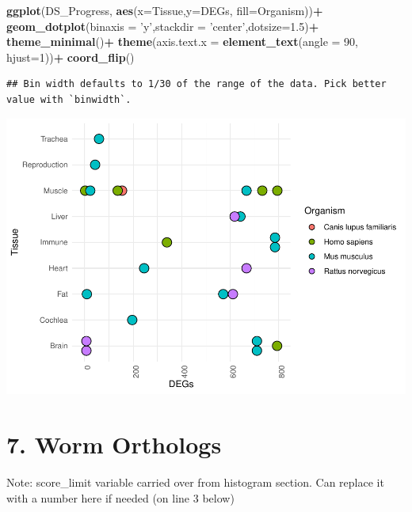 \documentclass[
]{article}
\newenvironment{Shaded}{\begin{snugshade}}{\end{snugshade}}
\newcommand{\DataTypeTok}[1]{\textcolor[rgb]{0.13,0.29,0.53}{#1}}
\newcommand{\DecValTok}[1]{\textcolor[rgb]{0.00,0.00,0.81}{#1}}
\newcommand{\FloatTok}[1]{\textcolor[rgb]{0.00,0.00,0.81}{#1}}
\newcommand{\KeywordTok}[1]{\textcolor[rgb]{0.13,0.29,0.53}{\textbf{#1}}}
\newcommand{\NormalTok}[1]{#1}
\newcommand{\OperatorTok}[1]{\textcolor[rgb]{0.81,0.36,0.00}{\textbf{#1}}}
\newcommand{\StringTok}[1]{\textcolor[rgb]{0.31,0.60,0.02}{#1}}
\begin{document}
\begin{Shaded}
\begin{Highlighting}[]
\KeywordTok{ggplot}\NormalTok{(DS_Progress, }\KeywordTok{aes}\NormalTok{(}\DataTypeTok{x=}\NormalTok{Tissue,}\DataTypeTok{y=}\NormalTok{DEGs, }\DataTypeTok{fill=}\NormalTok{Organism))}\OperatorTok{+}
\StringTok{  }\KeywordTok{geom_dotplot}\NormalTok{(}\DataTypeTok{binaxis =} \StringTok{'y'}\NormalTok{,}\DataTypeTok{stackdir =} \StringTok{'center'}\NormalTok{,}\DataTypeTok{dotsize=}\FloatTok{1.5}\NormalTok{)}\OperatorTok{+}
\StringTok{  }\KeywordTok{theme_minimal}\NormalTok{()}\OperatorTok{+}
\StringTok{  }\KeywordTok{theme}\NormalTok{(}\DataTypeTok{axis.text.x =} \KeywordTok{element_text}\NormalTok{(}\DataTypeTok{angle =} \DecValTok{90}\NormalTok{, }\DataTypeTok{hjust=}\DecValTok{1}\NormalTok{))}\OperatorTok{+}
\StringTok{  }\KeywordTok{coord_flip}\NormalTok{()}
\end{Highlighting}
\end{Shaded}

\begin{verbatim}
## Bin width defaults to 1/30 of the range of the data. Pick better value with `binwidth`.
\end{verbatim}

\includegraphics{Thesis_DualCodeTest_files/figure-latex/unnamed-chunk-42-1.pdf}

\hypertarget{worm-orthologs}{%
\section{7. Worm Orthologs}\label{worm-orthologs}}

Note: score\_limit variable carried over from histogram section. Can
replace it with a number here if needed (on line 3 below)
\end{document}
